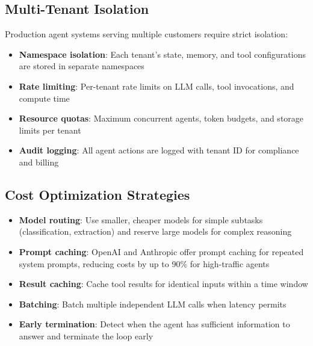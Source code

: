 \subsection{Multi-Tenant Isolation}
\label{multi-tenant-isolation}

Production agent systems serving multiple customers require strict isolation:

\begin{itemize}
  \item \textbf{Namespace isolation}: Each tenant’s state, memory, and tool configurations are stored in separate namespaces
  \item \textbf{Rate limiting}: Per-tenant rate limits on LLM calls, tool invocations, and compute time
  \item \textbf{Resource quotas}: Maximum concurrent agents, token budgets, and storage limits per tenant
  \item \textbf{Audit logging}: All agent actions are logged with tenant ID for compliance and billing
\end{itemize}

\subsection{Cost Optimization Strategies}
\label{cost-optimization-strategies}

\begin{itemize}
  \item \textbf{Model routing}: Use smaller, cheaper models for simple subtasks (classification, extraction) and reserve large models for complex reasoning
  \item \textbf{Prompt caching}: OpenAI and Anthropic offer prompt caching for repeated system prompts, reducing costs by up to 90\% for high-traffic agents
  \item \textbf{Result caching}: Cache tool results for identical inputs within a time window
  \item \textbf{Batching}: Batch multiple independent LLM calls when latency permits
  \item \textbf{Early termination}: Detect when the agent has sufficient information to answer and terminate the loop early
\end{itemize}

